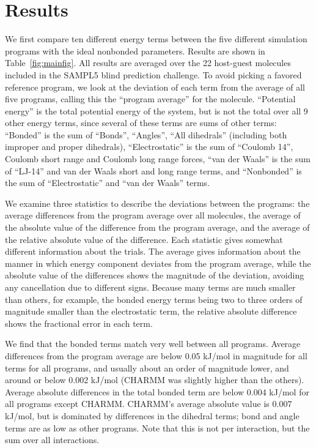 \section*{Results}
We first compare ten different energy terms between the five different
simulation programs with the ideal nonbonded parameters.  Results are
shown in Table~\ref{fig:mainfig}. All results are averaged over the 22
host-guest molecules included in the SAMPL5 blind prediction
challenge. To avoid picking a favored reference program, we look at
the deviation of each term from the average of all five programs,
calling this the ``program average'' for the molecule.  ``Potential
energy'' is the total potential energy of the system, but is not the
total over all 9 other energy terms, since several of these terms are
sums of other terms: ``Bonded'' is the sum of ``Bonds'', ``Angles'',
``All dihedrals'' (including both improper and proper dihedrals),
``Electrostatic'' is the sum of ``Coulomb 14'', Coulomb short range
and Coulomb long range forces, ``van der Waals'' is the sum of
``LJ-14'' and van der Waals short and long range terms, and
``Nonbonded'' is the sum of ``Electrostatic'' and ``van der Waals''
terms.

We examine three statistics to describe the deviations between the
programs: the average differences from the program average over all
molecules, the average of the absolute value of the difference from
the program average, and the average of the relative absolute value of
the difference. Each statistic gives somewhat different information
about the trials. The average gives information about the manner in
which energy component deviates from the program average, while the
absolute value of the differences shows the magnitude of the
deviation, avoiding any cancellation due to different signs.  Because
many terms are much smaller than others, for example, the bonded
energy terms being two to three orders of magnitude smaller than the
electrostatic term, the relative absolute difference shows the
fractional error in each term.

We find that the bonded terms match very well between all
programs. Average differences from the program average are below 0.05
kJ/mol in magnitude for all terms for all programs, and usually about
an order of magnitude lower, and around or below 0.002 kJ/mol (CHARMM
was slightly higher than the others). Average absolute differences in
the total bonded term are below 0.004 kJ/mol for all programs except
CHARMM. CHARMM's average absolute value is 0.007 kJ/mol, but is
dominated by differences in the dihedral terms; bond and angle terms
are as low as other programs.  Note that this is not per interaction,
but the sum over all interactions.

